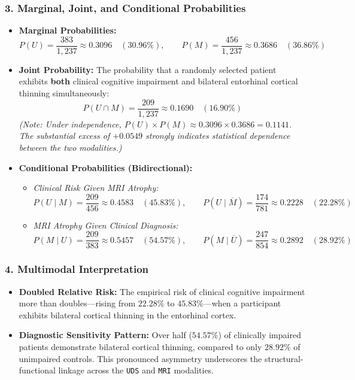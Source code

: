 \documentclass[11pt, a4paper]{article}
\begin{document}
\subsubsection*{3. Marginal, Joint, and Conditional Probabilities}
\begin{itemize}
    \item \textbf{Marginal Probabilities:}
    \[
    P(U) = \frac{383}{1,237} \approx 0.3096 \quad (30.96\%), \qquad P(M) = \frac{456}{1,237} \approx 0.3686 \quad (36.86\%)
    \]
    \item \textbf{Joint Probability:} The probability that a randomly selected patient exhibits \textbf{both} clinical cognitive impairment and bilateral entorhinal cortical thinning simultaneously:
    \[
    P(U \cap M) = \frac{209}{1,237} \approx 0.1690 \quad (16.90\%)
    \]
    \textit{(Note: Under independence, $P(U) \times P(M) \approx 0.3096 \times 0.3686 = 0.1141$. The substantial excess of $+0.0549$ strongly indicates statistical dependence between the two modalities.)}
    \item \textbf{Conditional Probabilities (Bidirectional):}
    \begin{itemize}
        \item \textit{Clinical Risk Given MRI Atrophy:}
        \[
        P(U \mid M) = \frac{209}{456} \approx 0.4583 \quad (45.83\%), \qquad P(U \mid \overline{M}) = \frac{174}{781} \approx 0.2228 \quad (22.28\%)
        \]
        \item \textit{MRI Atrophy Given Clinical Diagnosis:}
        \[
        P(M \mid U) = \frac{209}{383} \approx 0.5457 \quad (54.57\%), \qquad P(M \mid \overline{U}) = \frac{247}{854} \approx 0.2892 \quad (28.92\%)
        \]
    \end{itemize}
\end{itemize}

\subsubsection*{4. Multimodal Interpretation}
\begin{itemize}
    \item \textbf{Doubled Relative Risk:} The empirical risk of clinical cognitive impairment more than doubles---rising from $22.28\%$ to $45.83\%$---when a participant exhibits bilateral cortical thinning in the entorhinal cortex.
    \item \textbf{Diagnostic Sensitivity Pattern:} Over half ($54.57\%$) of clinically impaired patients demonstrate bilateral cortical thinning, compared to only $28.92\%$ of unimpaired controls. This pronounced asymmetry underscores the structural-functional linkage across the \texttt{UDS} and \texttt{MRI} modalities.
\end{itemize}
\end{document}
